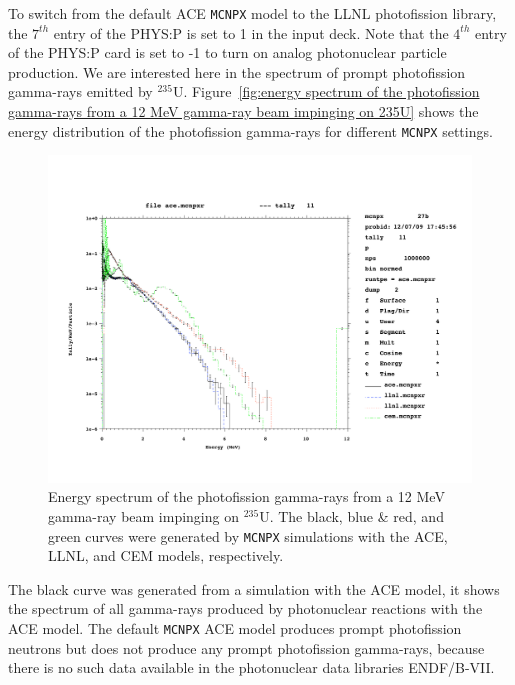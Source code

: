 To switch from the default ACE {\tt MCNPX} model to the LLNL photofission library, the $7^{th}$ entry of the PHYS:P is set to 1 in the input deck. Note that the $4^{th}$ entry of the PHYS:P card is set to -1 to turn on analog photonuclear particle production. We are interested here in the spectrum of prompt photofission gamma-rays emitted by $^{235}$U. Figure~\ref{fig:energy spectrum of the photofission gamma-rays from a 12 MeV gamma-ray beam impinging on 235U} shows the energy distribution of the photofission gamma-rays for different {\tt MCNPX} settings.

\begin{figure}[ht]
\begin{center}
\includegraphics[width=\textwidth]{eps/PhotofissionGammaSpectrum.pdf}
\end{center}
\caption{Energy spectrum of the photofission gamma-rays from a 12 MeV gamma-ray beam impinging on $^{235}$U. The black, blue \& red, and green curves were generated by {\tt MCNPX} simulations with the ACE, LLNL, and CEM models, respectively.}
\label{fig:energy spectrum of the photofission gamma-rays from a 12 MeV gamma-ray
beam impinging on 235U}
\end{figure}

The black curve was generated from a  simulation with the ACE model, it shows the spectrum of all gamma-rays produced 
by photonuclear reactions with the ACE model. The default {\tt MCNPX} ACE model produces prompt photofission 
neutrons but does not produce any prompt photofission gamma-rays, because there is no such data available in the 
photonuclear data libraries ENDF/B-VII. 

